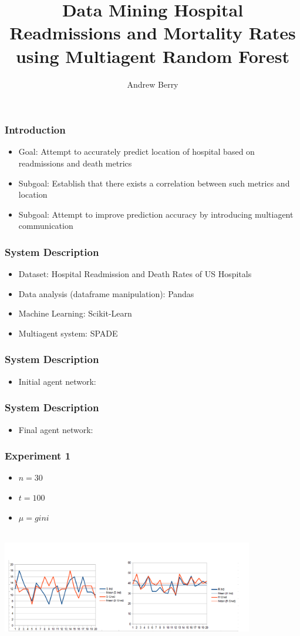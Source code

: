 \documentclass{beamer}
\title{Data Mining Hospital Readmissions and Mortality Rates using Multiagent Random Forest}
\author{Andrew Berry}
\begin{document}
	\frame{\titlepage}
	\begin{frame}
		\frametitle{Introduction}
		\begin{itemize}
			\item Goal: Attempt to accurately predict location of hospital based on readmissions and death metrics
			\item Subgoal: Establish that there exists a correlation between such metrics and location
			\item Subgoal: Attempt to improve prediction accuracy by introducing multiagent communication
		\end{itemize}
	\end{frame}

	\begin{frame}
		\frametitle{System Description}
		\begin{itemize}
			\item Dataset: Hospital Readmission and Death Rates of US Hospitals
			\item Data analysis (dataframe manipulation): Pandas
			\item Machine Learning: Scikit-Learn
			\item Multiagent system: SPADE
		\end{itemize}
	\end{frame}

	\begin{frame}
		\frametitle{System Description}
		\begin{itemize}
			\item Initial agent network:
		\end{itemize}
	\end{frame}

	\begin{frame}
		\frametitle{System Description}
		\begin{itemize}
			\item Final agent network:
		\end{itemize}
	\end{frame}

	\begin{frame}
		\frametitle{Experiment 1}
		\begin{itemize}
			\item $n = 30$
			\item $t = 100$
			\item $\mu = gini$
		\end{itemize}
		\includegraphics[width=11cm, height=5cm]{e1_comparative}
	\end{frame}
\end{document}
